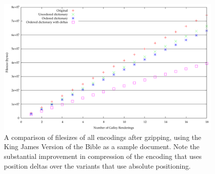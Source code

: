 \begin{figure}
  \begin{center}
  \includegraphics[height=\textwidth,angle=90]{gnuplot/kjv-gz}
  \end{center}
  \caption[Comparison of gzipped filesizes from all encodings]{A comparison of filesizes of all encodings after gzipping, using the King James Version of the Bible as a sample document. Note the substantial improvement in compression of the encoding that uses position deltas over the variants that use absolute positioning.}
  \label{fig:size-all-gz}
\end{figure}


